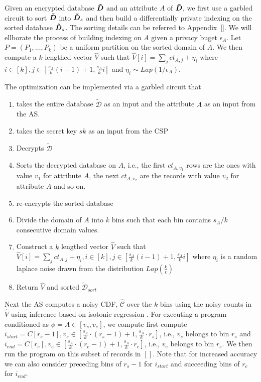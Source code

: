 Given an encrypted database $\boldsymbol{\tilde{D}}$ and an attribute $A$ of $\boldsymbol{\tilde{D}}$, we first use a garbled circuit to sort $\boldsymbol{\tilde{D}}$ into $\boldsymbol{\tilde{D}}_s$ and then build a differentially private indexing on the sorted database $\boldsymbol{\tilde{D}}_s$. The sorting details can be referred to Appendix~\ref{}. We will ellborate the process of building indexing on $A$ given a privacy buget $\epsilon_{A}$. Let $P=(P_1,\ldots,P_k)$ be a uniform partition on the sorted domain of $A$. We then compute a $k$ lengthed vector $\hat{V}$ such that $\hat{V}[i]=\sum_j ct_{A,j}+\eta_i$ where $i \in [k], j \in [\frac{s_A}{k}(i-1)+1,\frac{s_A}{k}i]$  and $\eta_i\sim Lap(1/\epsilon_A)$. 

 

 The optimization can be implemented via a garbled circuit that \begin{enumerate}\item takes the entire database $\boldsymbol{\mathcal{\tilde{D}}}$ as an input and the attribute $A$ as an input from the \textsf{AS}.
\item takes the secret key $sk$ as an input from  the \textsf{CSP} \item Decrypts $\boldsymbol{\mathcal{\tilde{D}}}$ \item Sorts the decrypted database on $A$, i.e., the first $ct_{A,v_1}$ rows are the ones with value $v_1$ for attribute $A$, the next $ct_{A,v_2}$ are  the records with value $v_2$ for attribute $A$ and so on. \item  re-encrypts the sorted database \item Divide the domain of $A$ into $k$ bins such that each bin contains $s_A/k$ consecutive domain values. \item Construct a $k$ lengthed vector $\hat{V}$ such that $\hat{V}[i]=\sum_jct_{A,j}+\eta_i, i \in [k], j \in [\frac{s_A}{k}(i-1)+1,\frac{s_A}{k}i]$ where $\eta_i$ is a random laplace noise drawn from the distribution $Lap(\frac{k}{\epsilon})$ \item Return $\hat{V}$ and sorted $\boldsymbol{\mathcal{\tilde{D}}}_{sort}$\end{enumerate}


Next the \textsf{AS} computes a noisy CDF, $\hat{\mathcal{C}}$ over the $k$ bins using the noisy counts in $\hat{V}$ using inference based on isotonic regression \cite{cdf}. For executing a program conditioned as $\phi=A \in [v_s,v_e]$, we compute first compute $i_{start}=C[r_s-1], v_s \in [\frac{s_A}{k}\cdot(r_s-1)+1,\frac{s_A}{k}\cdot r_s]$, i.e., $v_s$ belongs to bin $r_s$   and  $i_{end}=C[r_e], v_e \in [\frac{s_A}{k}\cdot(r_e-1)+1,\frac{s_A}{k}\cdot r_e]$, i.e., $v_e$ belongs to bin $r_e$. We then run the program on this subset of records in $[]$. Note that for increased accuracy we can also consider preceding bins of $r_s-1$ for $i_{start}$ and succeeding bins of $r_e$ for $i_{end}$.



